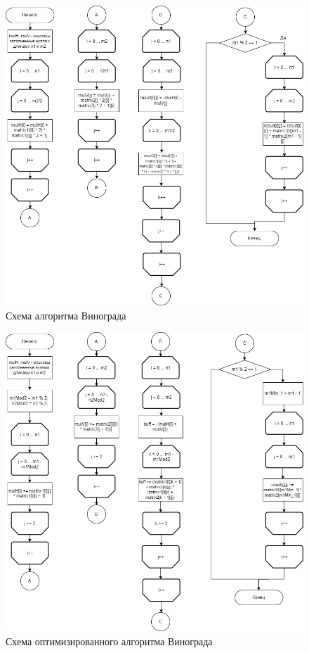 \documentclass[12pt]{report}
\begin{document}
\begin{figure}[pt]
\centering
\includegraphics[scale=0.6]{alg2.jpg}
\caption{Схема алгоритма Винограда}
\label{fig:mpr}
\end{figure}


\begin{figure}[pt]
\centering
\includegraphics[scale=0.6]{alg3.jpg}
\caption{Схема оптимизированного алгоритма Винограда}
\label{fig:mpr}
\end{figure}
\end{document}
